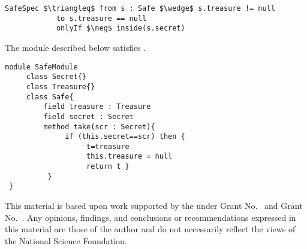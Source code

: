 \documentclass[acmsmall,review,anonymous]{acmart}\settopmatter{printfolios=true,printccs=false,printacmref=false}
\begin{document}
\begin{lstlisting}[language = Chainmail, mathescape=true, frame=lines]
SafeSpec $\triangleq$ from s : Safe $\wedge$ s.treasure != null
            to s.treasure == null
            onlyIf $\neg$ inside(s.secret)
\end{lstlisting}

The module   described  below satisfies  .

\begin{lstlisting}[frame=lines]
module SafeModule
     class Secret{}
     class Treasure{}
     class Safe{
         field treasure : Treasure
         field secret : Secret
         method take(scr : Secret){
              if (this.secret==scr) then {
                   t=treasure
                   this.treasure = null
                   return t } 
          }
 }
\end{lstlisting}

 





\begin{acks}                            %
  This material is based upon work supported by the
   under Grant
  No.~ and Grant
  No.~.  Any opinions, findings, and
  conclusions or recommendations expressed in this material are those
  of the author and do not necessarily reflect the views of the
  National Science Foundation.
\end{acks}



\end{document}
